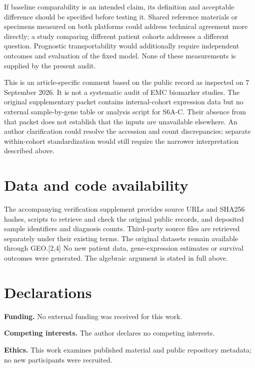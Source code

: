 \documentclass[11pt]{article}
\begin{document}
If baseline comparability is an intended claim, its definition and acceptable difference should be specified before testing it. Shared reference materials or specimens measured on both platforms could address technical agreement more directly; a study comparing different patient cohorts addresses a different question. Prognostic transportability would additionally require independent outcomes and evaluation of the fixed model. None of these measurements is supplied by the present audit.\par

This is an article-specific comment based on the public record as inspected on 7 September 2026. It is not a systematic audit of EMC biomarker studies. The original supplementary packet contains internal-cohort expression data but no external sample-by-gene table or analysis script for S6A-C. Their absence from that packet does not establish that the inputs are unavailable elsewhere. An author clarification could resolve the accession and count discrepancies; separate within-cohort standardization would still require the narrower interpretation described above.\par

\section*{Data and code availability}

The accompanying verification supplement provides source URLs and SHA256 hashes, scripts to retrieve and check the original public records, and deposited sample identifiers and diagnosis counts. Third-party source files are retrieved separately under their existing terms. The original datasets remain available through GEO.[2,4] No new patient data, gene-expression estimates or survival outcomes were generated. The algebraic argument is stated in full above.\par

\section*{Declarations}

\textbf{Funding.} No external funding was received for this work.\par

\textbf{Competing interests.} The author declares no competing interests.\par

\textbf{Ethics.} This work examines published material and public repository metadata; no new participants were recruited.\par
\end{document}
